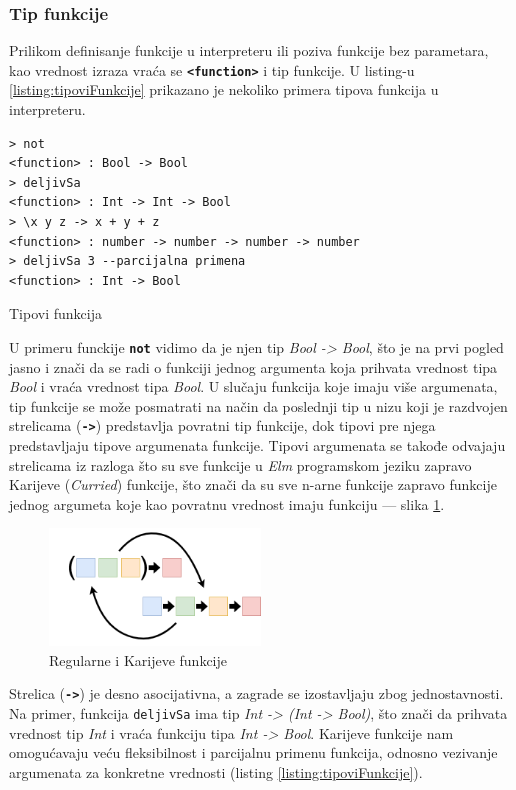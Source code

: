 \documentclass[12pt,oneside]{memoir}
\begin{document}
\subsubsection{Tip funkcije}
Prilikom definisanje funkcije u interpreteru ili
poziva funkcije bez parametara, kao vrednost izraza vraća se \texttt{\textbf{<function>}} 
i tip funkcije. U listing-u  \ref{listing:tipoviFunkcije} prikazano je nekoliko primera 
tipova funkcija u interpreteru.
\begin{listing}[h]
\begin{verbatim}
> not
<function> : Bool -> Bool
> deljivSa
<function> : Int -> Int -> Bool
> \x y z -> x + y + z
<function> : number -> number -> number -> number
> deljivSa 3 --parcijalna primena
<function> : Int -> Bool
\end{verbatim}
\caption{Tipovi funkcija}
\label{listing:tipoviFunkcije}
\end{listing} 
  
U primeru funckije \texttt{\textbf{not}} vidimo da je njen tip \emph{Bool -> Bool},
što je na prvi pogled jasno i znači da se radi o funkciji jednog argumenta koja
prihvata vrednost tipa \emph{Bool} i vraća vrednost tipa \emph{Bool}. U slučaju
funkcija koje imaju više argumenata, tip funkcije se može
posmatrati na način da poslednji tip u nizu koji je razdvojen strelicama
(\texttt{\textbf{->}}) predstavlja povratni tip funkcije, dok tipovi pre njega 
predstavljaju tipove argumenata funkcije. Tipovi argumenata se takođe odvajaju strelicama
iz razloga što su sve funkcije u \emph{Elm} programskom jeziku zapravo Karijeve (\emph{Curried}) funkcije,
što znači da su sve n-arne funkcije zapravo funkcije jednog argumeta
koje kao povratnu vrednost imaju funkciju --- slika \ref{fig:currying}.
\begin{figure}[!h]
  \centering
  \includegraphics[width=0.5\textwidth]{currying.png}
  \caption{Regularne i Karijeve funkcije}
  \label{fig:currying}
\end{figure}
Strelica (\texttt{\textbf{->}}) je desno asocijativna, a zagrade se izostavljaju zbog
jednostavnosti. Na primer, funkcija \texttt{deljivSa} ima tip \emph{Int -> (Int -> Bool)},
što znači da prihvata vrednost tip \emph{Int} i vraća funkciju tipa \emph{Int -> Bool}.
Karijeve funkcije nam omogućavaju veću fleksibilnost i parcijalnu primenu funkcija, 
odnosno vezivanje argumenata za konkretne vrednosti (listing \ref{listing:tipoviFunkcije}).
\end{document}
